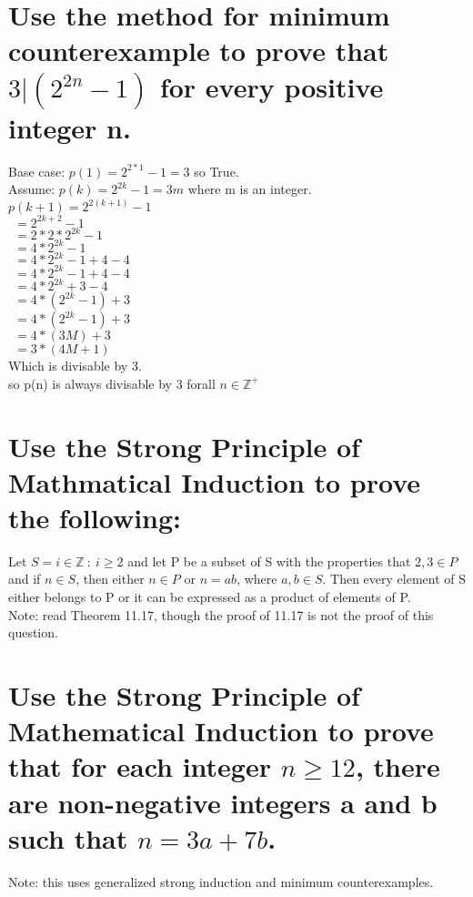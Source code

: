 \section{Use the method for minimum counterexample to prove that $3|(2^{2n}-1)$ for every positive integer n.}
Base case: $p(1) = 2^{2*1}-1 = 3$ so True.\\
Assume: $p(k) = 2^{2k}-1 = 3m$ where m is an integer.\\

$p(k+1) = 2^{2(k+1)}-1$\\
$\ \  = 2^{2k+2}-1$\\
$\ \  = 2*2*2^{2k}-1$\\
$\ \  = 4*2^{2k}-1$\\
$\ \  = 4*2^{2k}-1+4-4$\\
$\ \  = 4*2^{2k}-1+4-4$\\
$\ \  = 4*2^{2k}+3-4$\\
$\ \  = 4*(2^{2k}-1)+3$\\
$\ \  = 4*(2^{2k}-1)+3$\\
$\ \  = 4*(3M)+3$\\
$\ \  = 3*(4M+1)$\\
Which is divisable by 3.\\
so p(n) is always divisable by 3 forall $n\in \mathbb{Z}^{+}$

\section{Use the Strong Principle of Mathmatical Induction to prove the following:}
Let $S={i\in \mathbb{Z}\ : \ i\geq 2}$ and let P be a subset of S with the properties that 
$2 , 3 \in P$ and if 
$n\in S$, then either 
$n\in P$ or 
$n=ab$, where 
$a,b\in S$.
Then every element of S either belongs to P or it can be expressed as a product of elements of P.\\
Note: read Theorem 11.17, though the proof of 11.17 is not the proof of this question.


\section{Use the Strong Principle of Mathematical Induction to prove that for each integer $n\geq 12$, there are non-negative integers a and b such that $n = 3a + 7b$.} 
Note: this uses generalized strong induction and minimum counterexamples.



 

